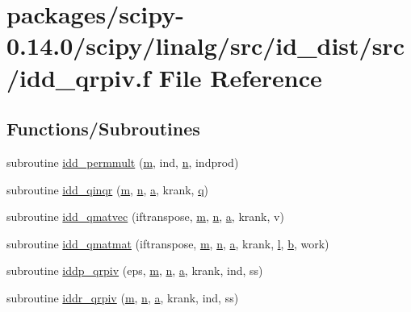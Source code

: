 \hypertarget{idd__qrpiv_8f}{}\section{packages/scipy-\/0.14.0/scipy/linalg/src/id\+\_\+dist/src/idd\+\_\+qrpiv.f File Reference}
\label{idd__qrpiv_8f}
\subsection*{Functions/\+Subroutines}
\begin{DoxyCompactItemize}
\item 
subroutine \hyperlink{idd__qrpiv_8f_ae489ab3f860f647c4068ad413bd73470}{idd\+\_\+permmult} (\hyperlink{indexexpr_8h_ab72fdb4031d47b75ab26dd18a437bcdc}{m}, ind, \hyperlink{indexexpr_8h_ab427e2e2b4d6cec55fa088ea2a692ace}{n}, indprod)
\item 
subroutine \hyperlink{idd__qrpiv_8f_a83ce59bf4a80c5710cac9782b067a11e}{idd\+\_\+qinqr} (\hyperlink{indexexpr_8h_ab72fdb4031d47b75ab26dd18a437bcdc}{m}, \hyperlink{indexexpr_8h_ab427e2e2b4d6cec55fa088ea2a692ace}{n}, \hyperlink{gen__mat5files_8m_aae328bf20413f220e38aec4d95bfd6da}{a}, krank, \hyperlink{indexexpr_8h_ac886c3584e464b5533390d7440c9dd98}{q})
\item 
subroutine \hyperlink{idd__qrpiv_8f_a7dfa9263f8e004a78d6edb009567f371}{idd\+\_\+qmatvec} (iftranspose, \hyperlink{indexexpr_8h_ab72fdb4031d47b75ab26dd18a437bcdc}{m}, \hyperlink{indexexpr_8h_ab427e2e2b4d6cec55fa088ea2a692ace}{n}, \hyperlink{gen__mat5files_8m_aae328bf20413f220e38aec4d95bfd6da}{a}, krank, v)
\item 
subroutine \hyperlink{idd__qrpiv_8f_af4508739e9e390c3d3e5a37d1decc222}{idd\+\_\+qmatmat} (iftranspose, \hyperlink{indexexpr_8h_ab72fdb4031d47b75ab26dd18a437bcdc}{m}, \hyperlink{indexexpr_8h_ab427e2e2b4d6cec55fa088ea2a692ace}{n}, \hyperlink{gen__mat5files_8m_aae328bf20413f220e38aec4d95bfd6da}{a}, krank, \hyperlink{indexexpr_8h_a88aacdaa46b76729743ee33ef8b95a58}{l}, \hyperlink{gen__mat5files_8m_a7b38767b3b6a8dae167e5afa4fc340b0}{b}, work)
\item 
subroutine \hyperlink{idd__qrpiv_8f_ad6e8a830d95c597c7bccae742fffe958}{iddp\+\_\+qrpiv} (eps, \hyperlink{indexexpr_8h_ab72fdb4031d47b75ab26dd18a437bcdc}{m}, \hyperlink{indexexpr_8h_ab427e2e2b4d6cec55fa088ea2a692ace}{n}, \hyperlink{gen__mat5files_8m_aae328bf20413f220e38aec4d95bfd6da}{a}, krank, ind, ss)
\item 
subroutine \hyperlink{idd__qrpiv_8f_ad23c19d247a3e768fdad4428616a9ea2}{iddr\+\_\+qrpiv} (\hyperlink{indexexpr_8h_ab72fdb4031d47b75ab26dd18a437bcdc}{m}, \hyperlink{indexexpr_8h_ab427e2e2b4d6cec55fa088ea2a692ace}{n}, \hyperlink{gen__mat5files_8m_aae328bf20413f220e38aec4d95bfd6da}{a}, krank, ind, ss)
\end{DoxyCompactItemize}


